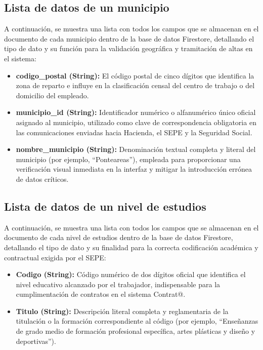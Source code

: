 \subsection{Lista de datos de un municipio}
A continuación, se muestra una lista con todos los campos que se almacenan en el documento de cada municipio dentro de la base de datos Firestore, detallando el tipo de dato y su función para la validación geográfica y tramitación de altas en el sistema:
\begin{itemize}
    \item \textbf{codigo\_postal (String):} El código postal de cinco dígitos que identifica la zona de reparto e influye en la clasificación censal del centro de trabajo o del domicilio del empleado.
    \item \textbf{municipio\_id (String):} Identificador numérico o alfanumérico único oficial asignado al municipio, utilizado como clave de correspondencia obligatoria en las comunicaciones enviadas hacia Hacienda, el SEPE y la Seguridad Social.
    \item \textbf{nombre\_municipio (String):} Denominación textual completa y literal del municipio (por ejemplo, ``Ponteareas''), empleada para proporcionar una verificación visual inmediata en la interfaz y mitigar la introducción errónea de datos críticos.
\end{itemize}


\subsection{Lista de datos de un nivel de estudios}
A continuación, se muestra una lista con todos los campos que se almacenan en el documento de cada nivel de estudios dentro de la base de datos Firestore, detallando el tipo de dato y su finalidad para la correcta codificación académica y contractual exigida por el SEPE:
\begin{itemize}
    \item \textbf{Codigo (String):} Código numérico de dos dígitos oficial que identifica el nivel educativo alcanzado por el trabajador, indispensable para la cumplimentación de contratos en el sistema Contrat@.
    \item \textbf{Titulo (String):} Descripción literal completa y reglamentaria de la titulación o la formación correspondiente al código (por ejemplo, ``Enseñanzas de grado medio de formación profesional específica, artes plásticas y diseño y deportivas'').
\end{itemize}

